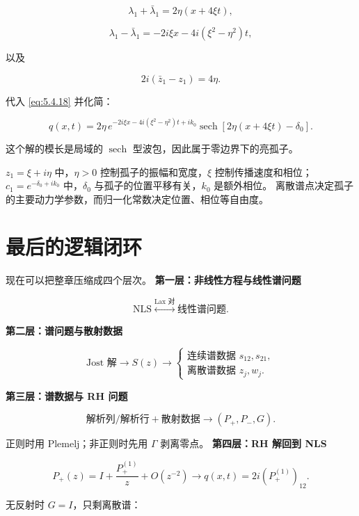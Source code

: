 \documentclass[
    lang=cn,
    scheme=chinese,
    mode=simple,
    device=normal,
    color=blue,
    math=cm,
    thmcnt=section,
    12pt
]{elegantbook}
\begin{document}
\[
    \lambda_1+\bar\lambda_1
    =
    2\eta(x+4\xi t),
\]

\[
    \lambda_1-\bar\lambda_1
    =
    -2i\xi x-4i(\xi^2-\eta^2)t,
\]

以及

\[
    2i(\bar z_1-z_1)=4\eta.
\]

代入 \eqref{eq:5.4.18} 并化简：

\[
    \boxed{
        q(x,t)
        =
        2\eta\,
        e^{-2i\xi x-4i(\xi^2-\eta^2)t+ik_0}
        \operatorname{sech}
        \!\left[
            2\eta(x+4\xi t)-\delta_0
            \right].
    }
\]

这个解的模长是局域的 $\operatorname{sech}$ 型波包，因此属于零边界下的亮孤子。

\begin{callout}[参数的直观意义]
    $z_1=\xi+i\eta$ 中，$\eta>0$ 控制孤子的振幅和宽度，$\xi$ 控制传播速度和相位；$c_1=e^{-\delta_0+ik_0}$ 中，$\delta_0$ 与孤子的位置平移有关，$k_0$ 是额外相位。
    离散谱点决定孤子的主要动力学参数，而归一化常数决定位置、相位等自由度。
\end{callout}

\section*{最后的逻辑闭环}

现在可以把整章压缩成四个层次。
\textbf{第一层：非线性方程与线性谱问题}

\[
    \text{NLS}
    \overset{\text{Lax 对}}{\longleftrightarrow}
    \text{线性谱问题}.
\]

\textbf{第二层：谱问题与散射数据}

\[
    \text{Jost 解}
    \longrightarrow
    S(z)
    \longrightarrow
    \begin{cases}
        \text{连续谱数据 }s_{12},s_{21}, \\
        \text{离散谱数据 }z_j,w_j.
    \end{cases}
\]

\textbf{第三层：谱数据与 RH 问题}

\[
    \text{解析列/解析行}
    +
    \text{散射数据}
    \longrightarrow
    (P_+,P_-,G).
\]

正则时用 Plemelj；非正则时先用 $\Gamma$ 剥离零点。
\textbf{第四层：RH 解回到 NLS}

\[
    P_+(z)
    =
    I+\dfrac{P_+^{(1)}}{z}+O(z^{-2})
    \longrightarrow
    q(x,t)=2i(P_+^{(1)})_{12}.
\]

无反射时 $G=I$，只剩离散谱：
\end{document}

